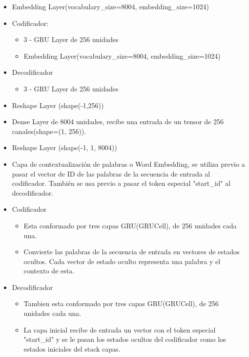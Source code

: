 \documentclass[12pt, letterpaper]{article}
\begin{document}
        \begin{itemize}
            \item Embedding Layer(vocabulary\_size=8004, embedding\_size=1024)
            \item Codificador:
                \begin{itemize}
                    \item 3 - GRU Layer de 256 unidades
                    \item Embedding Layer(vocabulary\_size=8004, embedding\_size=1024)
                \end{itemize}
            \item Decodificador
                \begin{itemize}
                    \item 3 - GRU Layer de 256 unidades
                \end{itemize}
            \item Reshape Layer (shape(-1,256))
            \item Dense Layer de 8004 unidades, recibe una entrada de un tensor de 256 canales(shape=(1, 256)).
            \item Reshape Layer (shape(-1, 1, 8004))
            \item Capa de contextualización de palabras o Word Embedding, se utiliza previo a pasar el vector de ID de las palabras de la secuencia de entrada al codificador. También se usa previo a pasar el token especial "start\_id" al decodificador.
            \item Codificador
                \begin{itemize}
                    \item Esta conformado por tres capas GRU(GRUCell), de 256 unidades cada una.
                    \item Convierte las palabras de la secuencia de entrada en vectores de estados ocultos. Cada vector de estado oculto representa una palabra y el contexto de esta.
                \end{itemize}
            \item Decodificador
            \begin{itemize}
                \item Tambien esta conformado por tres capas GRU(GRUCell), de 256 unidades cada una.
                \item La capa inicial recibe de entrada un vector con el token especial "start\_id" y se le pasan los estados ocultos del codificador como los estados iniciales del stack capas.

\end{itemize}
\end{itemize}
\end{document}
